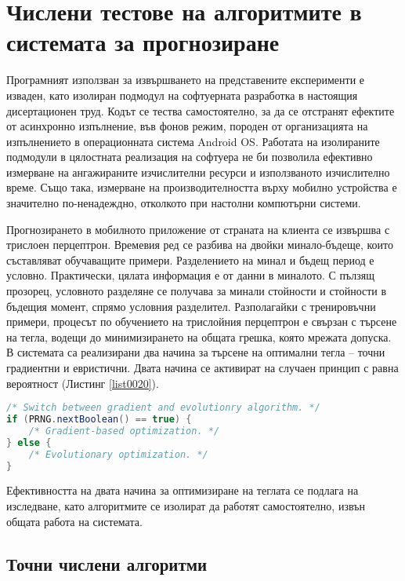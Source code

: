 ﻿\chapter{Числени тестове на алгоритмите в системата за прогнозиране}

Програмният използван за извършването на представените експерименти е изваден, като изолиран подмодул на софтуерната разработка в настоящия дисертационен труд. Кодът се тества самостоятелно, за да се отстранят ефектите от асинхронно изпълнение, във фонов режим, породен от организацията на изпълнението в операционната система Android OS. Работата на изолираните подмодули в цялостната реализация на софтуера не би позволила ефективно измерване на ангажираните изчислителни ресурси и използваното изчислително време. Също така, измерване на производителността върху мобилно устройства е значително по-ненадеждно, отколкото при настолни компютърни системи. 

Прогнозирането в мобилното приложение от страната на клиента се извършва с трислоен перцептрон. Времевия ред се разбива на двойки минало-бъдеще, които съставляват обучаващите примери. Разделението на минал и бъдещ период е условно. Практически, цялата информация е от данни в миналото. С пълзящ прозорец, условното разделяне се получава за минали стойности и стойности в бъдещия момент, спрямо условния разделител. Разполагайки с тренировъчни примери, процесът по обучението на трислойния перцептрон е свързан с търсене на тегла, водещи до минимизирането на общата грешка, която мрежата допуска. В системата са реализирани два начина за търсене на оптимални тегла – точни градиентни и евристични. Двата начина се активират на случаен принцип с равна вероятност (Листинг \ref{list0020}).

\begin{lstlisting}[caption=Превключване на алгоритмите за обучение, language=Java, basicstyle=\tiny, label=list0020]
/* Switch between gradient and evolutionry algorithm. */
if (PRNG.nextBoolean() == true) {
	/* Gradient-based optimization. */
} else {
	/* Evolutionary optimization. */
}
\end{lstlisting}

Ефективността на двата начина за оптимизиране на теглата се подлага на изследване, като алгоритмите се изолират да работят самостоятелно, извън общата работа на системата. 

\section{Точни числени алгоритми}


